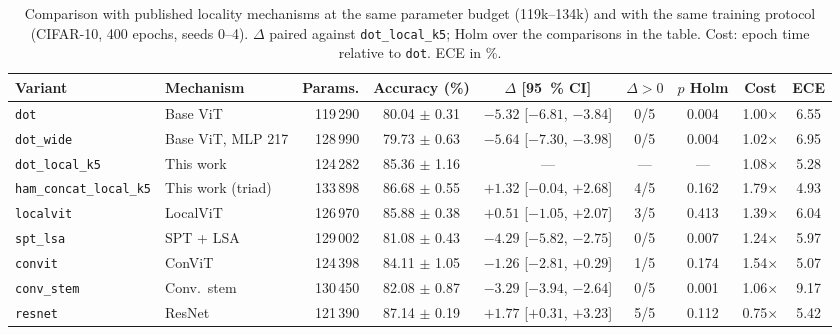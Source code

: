 
\begin{table}[!t]
\centering
\small
\caption{Comparison with published locality mechanisms at the same parameter budget (119k--134k) and with the same training protocol (CIFAR-10, 400 epochs, seeds 0--4). $\Delta$ paired against \texttt{dot\_local\_k5}; Holm over the comparisons in the table. Cost: epoch time relative to \texttt{dot}. ECE in \%.}
\label{tab:baselines}
\begin{adjustbox}{max width=\linewidth}
\begin{tabular}{llrcccccc}
\toprule
Variant & Mechanism & Params. & Accuracy (\%) & $\Delta$ [95~\% CI] & $\Delta>0$ & $p$ Holm & Cost & ECE \\
\midrule
\texttt{dot} & Base ViT & 119\,290 & 80.04 $\pm$ 0.31 & $-5.32$ [$-6.81$, $-3.84$] & 0/5 & 0.004 & 1.00$\times$ & 6.55 \\
\texttt{dot\_wide} & Base ViT, MLP 217 & 128\,990 & 79.73 $\pm$ 0.63 & $-5.64$ [$-7.30$, $-3.98$] & 0/5 & 0.004 & 1.02$\times$ & 6.95 \\
\texttt{dot\_local\_k5} & This work & 124\,282 & 85.36 $\pm$ 1.16 & --- & --- & --- & 1.08$\times$ & 5.28 \\
\texttt{ham\_concat\_local\_k5} & This work (triad) & 133\,898 & 86.68 $\pm$ 0.55 & $+1.32$ [$-0.04$, $+2.68$] & 4/5 & 0.162 & 1.79$\times$ & 4.93 \\
\midrule
\texttt{localvit} & LocalViT \cite{li2021localvit} & 126\,970 & 85.88 $\pm$ 0.38 & $+0.51$ [$-1.05$, $+2.07$] & 3/5 & 0.413 & 1.39$\times$ & 6.04 \\
\texttt{spt\_lsa} & SPT + LSA \cite{lee2021vision} & 129\,002 & 81.08 $\pm$ 0.43 & $-4.29$ [$-5.82$, $-2.75$] & 0/5 & 0.007 & 1.24$\times$ & 5.97 \\
\texttt{convit} & ConViT \cite{dascoli2021convit} & 124\,398 & 84.11 $\pm$ 1.05 & $-1.26$ [$-2.81$, $+0.29$] & 1/5 & 0.174 & 1.54$\times$ & 5.07 \\
\texttt{conv\_stem} & Conv.\ stem \cite{xiao2021early} & 130\,450 & 82.08 $\pm$ 0.87 & $-3.29$ [$-3.94$, $-2.64$] & 0/5 & 0.001 & 1.06$\times$ & 9.17 \\
\texttt{resnet} & ResNet \cite{he2016deep} & 121\,390 & 87.14 $\pm$ 0.19 & $+1.77$ [$+0.31$, $+3.23$] & 5/5 & 0.112 & 0.75$\times$ & 5.42 \\
\bottomrule
\end{tabular}
\end{adjustbox}
\end{table}
